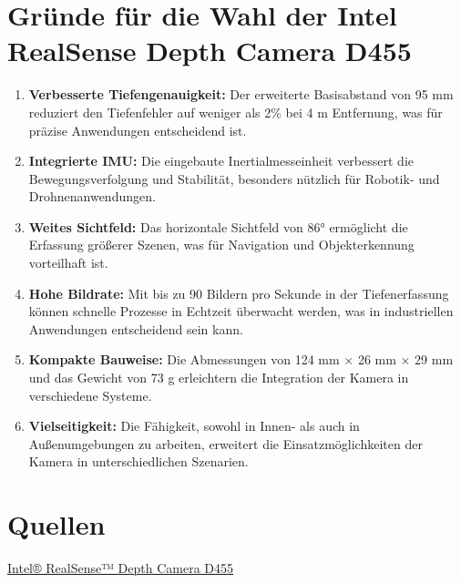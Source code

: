 \documentclass[a4paper,12pt]{article}
\begin{document}
\section*{Gründe für die Wahl der Intel RealSense Depth Camera D455}

\begin{enumerate}
    
    \item \textbf{Verbesserte Tiefengenauigkeit:} Der erweiterte Basisabstand von 95 mm reduziert den Tiefenfehler 
    auf weniger als 2\% bei 4 m Entfernung, was für präzise Anwendungen entscheidend ist.
    \item \textbf{Integrierte IMU:} Die eingebaute Inertialmesseinheit verbessert die Bewegungsverfolgung und 
    Stabilität, besonders nützlich für Robotik- und Drohnenanwendungen.
    \item \textbf{Weites Sichtfeld:} Das horizontale Sichtfeld von 86° ermöglicht die Erfassung größerer Szenen, 
    was für Navigation und Objekterkennung vorteilhaft ist.
    \item \textbf{Hohe Bildrate:} Mit bis zu 90 Bildern pro Sekunde in der Tiefenerfassung können schnelle 
    Prozesse in Echtzeit überwacht werden, was in industriellen Anwendungen entscheidend sein kann.
    \item \textbf{Kompakte Bauweise:} Die Abmessungen von 124 mm × 26 mm × 29 mm und das Gewicht von 73 g 
    erleichtern die Integration der Kamera in verschiedene Systeme.
    \item \textbf{Vielseitigkeit:} Die Fähigkeit, sowohl in Innen- als auch in Außenumgebungen zu arbeiten, 
    erweitert die Einsatzmöglichkeiten der Kamera in unterschiedlichen Szenarien.
\end{enumerate}

\section*{Quellen}
\textcolor{blue}{\href{https://www.intelrealsense.com/depth-camera-d455/}{Intel® RealSense™ Depth Camera D455}}
\end{document}
